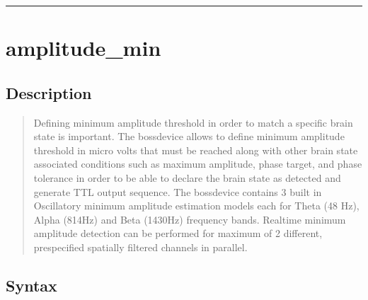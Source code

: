 \documentclass[letterpaper,10pt,english]{sphinxmanual}
\begin{document}
\bigskip\hrule\bigskip



\section{amplitude\_min}
\label{\detokenize{4_api_documentation:amplitude-min}}

\subsection{Description}
\label{\detokenize{4_api_documentation:id28}}\begin{quote}

\sphinxAtStartPar
Defining minimum amplitude threshold in order to match a specific brain state is important. The bossdevice allows to define minimum amplitude threshold in micro volts that must be reached along with other brain state associated conditions such as maximum amplitude, phase target, and phase tolerance in order to be able to declare the brain state as detected and generate TTL output sequence. The bossdevice contains 3 built in Oscillatory minimum amplitude estimation models each for Theta (4\sphinxhyphen{}8 Hz), Alpha (8\sphinxhyphen{}14Hz) and Beta (14\sphinxhyphen{}30Hz) frequency bands. Real\sphinxhyphen{}time minimum amplitude detection can be performed for maximum of 2 different, pre\sphinxhyphen{}specified spatially filtered channels in parallel.
\end{quote}


\subsection{Syntax}
\label{\detokenize{4_api_documentation:id29}}
\begin{sphinxVerbatim}[commandchars=\\\{\}]
\PYG{p}{[}\PYG{p}{]}
\PYG{p}{[}\PYG{p}{]}
\PYG{p}{[}\PYG{p}{]}
\end{sphinxVerbatim}
\end{document}
